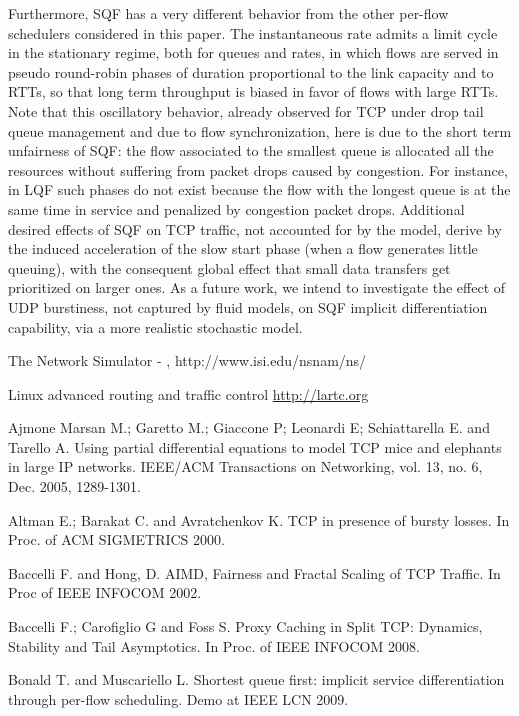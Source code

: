 \documentclass[a4paper,oneside, 11pt]{article}
\begin{document}
Furthermore,
SQF has a very different behavior from the other per-flow schedulers considered in this paper.
The instantaneous rate admits a limit cycle in the stationary regime, both for queues and rates,
in which flows are served in pseudo round-robin phases of duration proportional to the link capacity and to RTTs, so that long term throughput is biased in favor of flows with large RTTs.
Note that this oscillatory behavior, already observed for TCP under drop tail queue management and due to flow synchronization, here is due to the short term unfairness of SQF: the flow associated to the smallest queue is allocated
all the resources without suffering from  packet drops caused by congestion.
For instance, in LQF such phases do not exist because the flow with the longest queue is at the same time in service and penalized by
congestion packet drops.
Additional desired effects of SQF on TCP traffic, not accounted for by the model, derive
by the induced acceleration of the slow start phase (when a flow generates little queuing),
with the consequent global effect that small data transfers get prioritized on larger ones.
As a future work, we intend to investigate the effect of UDP burstiness, not captured by fluid models, on SQF implicit differentiation
capability, via a more realistic stochastic model.


The Network Simulator - ,
http://www.isi.edu/nsnam/ns/

Linux advanced routing and traffic control \url{http://lartc.org}

Ajmone Marsan M.;  Garetto M.; Giaccone P; Leonardi E;  Schiattarella E. and Tarello A.
Using partial differential equations to model TCP mice and elephants in large IP networks.
IEEE/ACM Transactions on Networking, vol. 13, no. 6, Dec. 2005, 1289-1301.

Altman E.; Barakat C. and Avratchenkov K.
TCP in presence of bursty losses.
In Proc. of ACM SIGMETRICS 2000.

Baccelli F. and Hong, D.
AIMD, Fairness and Fractal Scaling of TCP Traffic.	
In Proc of IEEE INFOCOM 2002.

Baccelli F.; Carofiglio G and Foss S.
Proxy Caching in Split TCP: Dynamics, Stability and Tail Asymptotics.
In Proc. of IEEE INFOCOM 2008.

Bonald T. and Muscariello L.
Shortest queue first: implicit service differentiation through per-flow scheduling.
Demo at IEEE LCN 2009.
\end{document}
